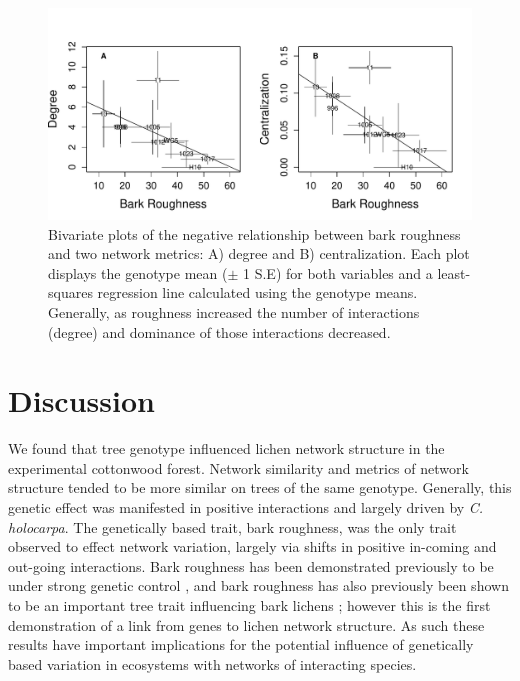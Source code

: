 \documentclass[11pt,twocolumn,twoside,lineno]{pnas-new}
\begin{document}
\begin{figure}[ht]
\centering
\includegraphics[width=\linewidth]{br_net.pdf}
\caption{Bivariate plots of the negative relationship between bark
  roughness and two network metrics: A) degree and B)
  centralization. Each plot displays the genotype mean ($\pm$ 1 S.E)
  for both variables and a least-squares regression line calculated
  using the genotype means. Generally, as roughness increased the
  number of interactions (degree) and dominance of
  those interactions decreased.}
\label{fig:br_net}
\end{figure}




\section*{Discussion}

We found that tree genotype influenced lichen network structure in the
experimental cottonwood forest. Network similarity and metrics of
network structure tended to be more similar on trees of the same
genotype. Generally, this genetic effect was manifested in positive
interactions and largely driven by \textit{C. holocarpa}. The
genetically based trait, bark roughness, was the only trait observed
to effect network variation, largely via shifts in positive in-coming
and out-going interactions. Bark roughness has been demonstrated
previously to be under strong genetic control \cite{Bdeir2017}, and
bark roughness has also previously been shown to be an important tree
trait influencing bark lichens \cite{Lamit2015a}; however this is the
first demonstration of a link from genes to lichen network structure.
As such these results have important implications for the potential
influence of genetically based variation in ecosystems with networks
of interacting species.
\end{document}
